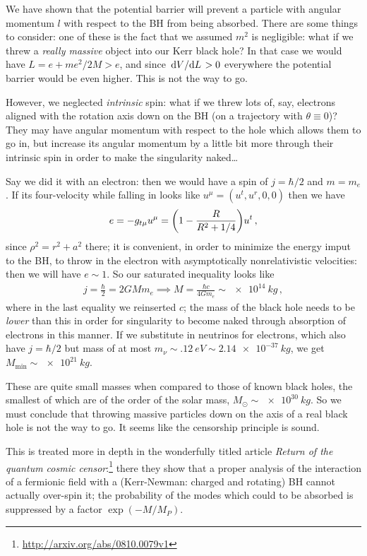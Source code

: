 \documentclass[main.tex]{subfiles}
\begin{document}
We have shown that the potential barrier will prevent a particle with angular momentum \(l\) with respect to the BH from being absorbed. 
There are some things to consider: one of these is the fact that we assumed \(m^2\) is negligible: what if we threw a \emph{really massive} object into our Kerr black hole?
In that case we would have \(L = e + m e^2 / 2M > e\), and since \(\dv*{V}{L} > 0\) everywhere the potential barrier would be even higher. This is not the way to go. 

However, we neglected \emph{intrinsic} spin: what if we threw lots of, say, electrons aligned with the rotation axis down on the BH (on a trajectory with \(\theta \equiv 0\))? 
They may have angular momentum with respect to the hole which allows them to go in, but increase its angular momentum by a little bit more through their intrinsic spin in order to make the singularity naked\dots

Say we did it with an electron: then we would have a spin of \(j= \hbar /2\) and \(m = m_e\). If its four-velocity while falling in looks like \(u^{\mu } = (u^{t}, u^{r}, 0,0)\) then we have 
%
\begin{align}
  e =- g_{t \mu } u^{\mu } = 
  \qty(1 - \frac{R}{R^2 + 1/4}) u^{t}
\,,
\end{align}
%
since \(\rho^2 = r^2 + a^2 \) there; it is convenient, in order to minimize the energy imput to the BH, to throw in the electron with asymptotically nonrelativistic velocities: then we will have \(e \sim 1\). So our saturated inequality looks like 
%
\begin{align}
  j = \frac{\hbar}{2}= 2GM m_e  \implies M = \frac{\hbar c}{4Gm_e} \sim \SI{e14}{kg}
\,,
\end{align}
%
where in the last equality we reinserted \(c\);
the mass of the black hole needs to be \emph{lower} than this in order for singularity to become naked through absorption of electrons in this manner.
If we substitute in neutrinos for electrons, which also have \(j = \hbar/2\) but mass of at most \(m_\nu \sim \SI{.12}{eV} \sim \SI{2.14e-37}{kg}\), we get \(M _{\text{min}} \sim \SI{e21}{kg}\). 

These are quite small masses when compared to those of known black holes, the smallest of which are of the order of the solar mass, \(M_{\odot} \sim \SI{e30}{kg}\).
So we must conclude that throwing massive particles down on the axis of a real black hole is not the way to go. 
It seems like the censorship principle is sound. 

This is treated more in depth in the wonderfully titled article \emph{Return of the quantum cosmic censor}:\footnote{\url{http://arxiv.org/abs/0810.0079v1}}
there they show that a proper analysis of the interaction of a fermionic field with a (Kerr-Newman: charged and rotating) BH cannot actually over-spin it; the probability of the modes which could to be absorbed is suppressed by a factor \(\exp(- M / M_P)\).  
\end{document}
